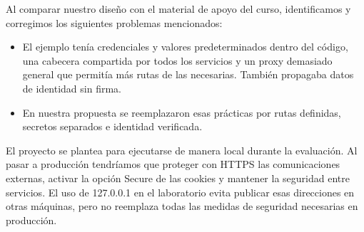 \documentclass[10pt,letterpaper]{article}
\begin{document}
Al comparar nuestro diseño con el material de apoyo del curso, identificamos y corregimos los siguientes problemas mencionados:

\begin{itemize}
\item El ejemplo tenía credenciales y valores predeterminados dentro del código, una cabecera compartida por todos los servicios y un proxy demasiado general que permitía más rutas de las necesarias. También propagaba datos de identidad sin firma.
\item En nuestra propuesta se reemplazaron esas prácticas por rutas definidas, secretos separados e identidad verificada.
\end{itemize}
El proyecto se plantea para ejecutarse de manera local durante la evaluación. Al pasar a producción tendríamos que proteger con HTTPS las comunicaciones externas, activar la opción Secure de las cookies y mantener la seguridad entre servicios. El uso de 127.0.0.1 en el laboratorio evita publicar esas direcciones en otras máquinas, pero no reemplaza todas las medidas de seguridad necesarias en producción.
\end{document}
